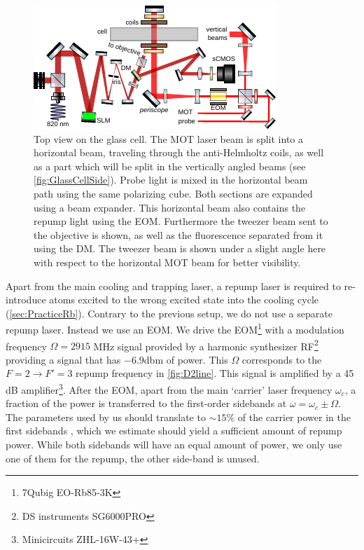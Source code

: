 \begin{figure}[t]
    \centering
    \includegraphics[width=\textwidth]{figures/MOTupview.pdf}
    \caption{
    Top view on the glass cell.
    The MOT laser beam is split into a horizontal beam, traveling through the anti-Helmholtz coils, as well as a part which will be split in the vertically angled beams (see \cref{fig:GlassCellSide}). 
    Probe light is mixed in the horizontal beam path using the same polarizing cube. 
    Both sections are expanded using a beam expander.
    This horizontal beam also contains the repump light using the \ac{EOM}.
    Furthermore the tweezer beam sent to the objective is shown, as well as the fluorescence separated from it using the \acf{DM}.
    The tweezer beam is shown under a slight angle here with respect to the horizontal MOT beam for better visibility. 
    }
    \label{fig:GlassCellTop}
\end{figure}

Apart from the main cooling and trapping laser, a repump laser is required to re-introduce atoms excited to the wrong excited state into the cooling cycle (\cref{sec:PracticeRb}).
Contrary to the previous setup, we do not use a separate repump laser. 
Instead we use an \acf{EOM}.
We drive the EOM\footnote{7Qubig EO-Rb85-3K} with a modulation frequency $\Omega= 2915$ MHz signal provided by a harmonic synthesizer RF\footnote{DS instruments SG6000PRO} providing a signal that has $-6.9$dbm of power.
This $\Omega$ corresponds to the $F=2 \rightarrow F'=3$ repump frequency in \cref{fig:D2line}.
This signal is amplified by a 45 dB amplifier\footnote{Minicircuits ZHL-16W-43+}.
After the EOM, apart from the main \lq carrier' laser frequency $\omega_c$, a fraction of the power is transferred to the first-order sidebands at $\omega = \omega_c \pm 
\Omega$.
The parameters used by us should translate to $\sim 15$\% of the carrier power in the first sidebands \cite{Rens2014}, which we estimate should yield a sufficient amount of repump power. 
While both sidebands will have an equal amount of power, we only use one of them for the repump, the other side-band is unused. 

